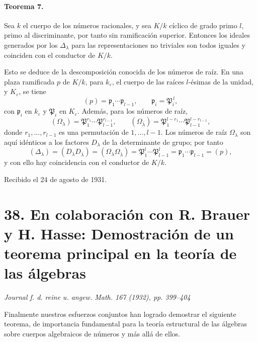 \paragraph{Teorema 7.}
Sea \(k\) el cuerpo de los números racionales, y sea \(K/k\) cíclico de grado primo \(l\), primo al discriminante, por tanto sin ramificación superior. Entonces los ideales generados por los \(\Delta_\lambda\) para las representaciones no triviales son todos iguales y coinciden con el conductor de \(K/k\).

Esto se deduce de la descomposición conocida de los números de raíz. En una plaza ramificada \(p\) de \(K/k\), para \(k_\varepsilon\), el cuerpo de las raíces \(l\)-ésimas de la unidad, y \(K_\varepsilon\), se tiene
\[
        (p)=\mathfrak p_1\cdots\mathfrak p_{l-1},\qquad
        \mathfrak p_i=\mathfrak P_i^{\,l},
\]
con \(\mathfrak p_i\) en \(k_\varepsilon\) y \(\mathfrak P_i\) en \(K_\varepsilon\). Además, para los números de raíz,
\[
        (\Omega_\lambda)=\mathfrak P_1^{r_1}\cdots
        \mathfrak P_{l-1}^{r_{l-1}},
        \qquad
        (\Omega_{\bar\lambda})=
        \mathfrak P_1^{l-r_1}\cdots \mathfrak P_{l-1}^{l-r_{l-1}},
\]
donde \(r_1,\ldots,r_{l-1}\) es una permutación de \(1,\ldots,l-1\). Los números de raíz \(\Omega_\lambda\) son aquí idénticos a los factores \(D_\lambda\) de la determinante de grupo; por tanto
\[
        (\Delta_\lambda)=(D_\lambda D_{\bar\lambda})
        =(\Omega_\lambda\Omega_{\bar\lambda})
        =\mathfrak P_1^l\cdots\mathfrak P_{l-1}^l
        =\mathfrak p_1\cdots\mathfrak p_{l-1}
        =(p),
\]
y con ello hay coincidencia con el conductor de \(K/k\).

\begin{center}
Recibido el 24 de agosto de 1931.
\end{center}

\section*{38. En colaboración con R. Brauer y H. Hasse: Demostración de un teorema principal en la teoría de las álgebras}

\begin{center}
\emph{Journal f. d. reine u. angew. Math. 167 (1932), pp. 399--404}
\end{center}

Finalmente nuestros esfuerzos conjuntos han logrado demostrar el siguiente teorema, de importancia fundamental para la teoría estructural de las álgebras sobre cuerpos algebraicos de números y más allá de ellos.

